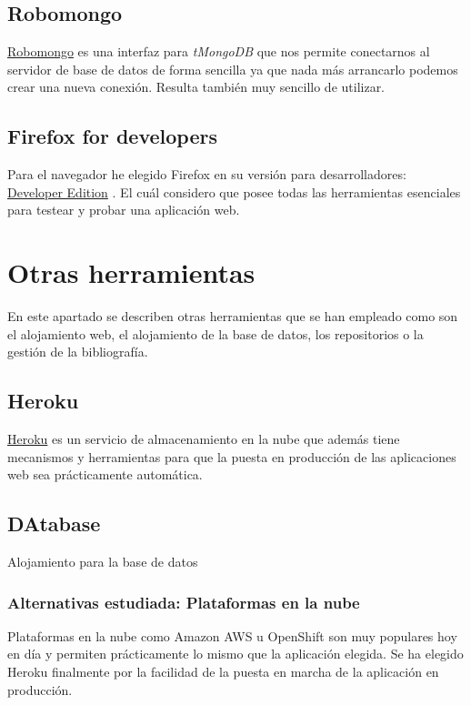 \subsection{Robomongo}\label{entorno-desarrollo}
\hyperlink{http://http//robomongo.org/}{Robomongo} es una interfaz para \emph{tMongoDB} que nos permite conectarnos al servidor de base de datos de forma sencilla ya que nada más arrancarlo podemos crear una nueva conexión. Resulta también muy sencillo de utilizar.


\subsection{Firefox for developers}\label{firefox}
Para el navegador he elegido Firefox en su versión para desarrolladores: \hyperlink{https://www.mozilla.org/es-ES/firefox/developer}{Developer Edition} . El cuál considero que posee todas las herramientas esenciales para testear y probar una aplicación web.



\section{Otras herramientas}\label{herramientas}
En este apartado se describen otras herramientas que se han empleado como son el alojamiento web, el alojamiento de la base de datos, los repositorios o la gestión de la bibliografía.

 \subsection{Heroku}\label{heroku}
\hyperlink{https://www.heroku.com/}{Heroku}  es un servicio de almacenamiento en la nube que además tiene mecanismos y herramientas para que la puesta en producción de las aplicaciones web sea prácticamente automática.

 \subsection{DAtabase}\label{heroku}
 Alojamiento para la base de datos

  \subsubsection{Alternativas estudiada: Plataformas en la nube}\label{tnube}
  Plataformas en la nube como Amazon AWS u OpenShift son muy populares hoy en día y permiten prácticamente lo mismo que la aplicación elegida. Se ha elegido Heroku finalmente por la facilidad de la puesta en marcha de la aplicación en producción.
  
